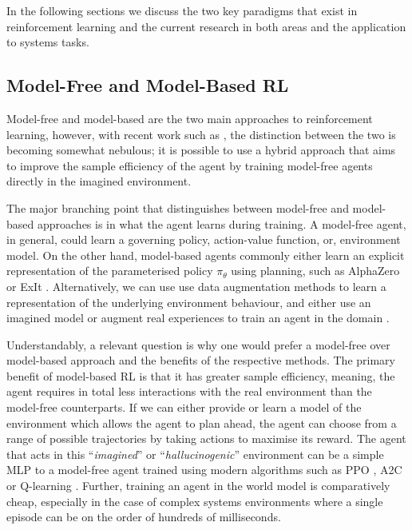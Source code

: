 In the following sections we discuss the two key paradigms that exist in reinforcement learning and the current research in both areas and the application to systems tasks.

\subsection{Model-Free and Model-Based RL}

Model-free and model-based are the two main approaches to reinforcement learning, however, with recent work such as \cite{app10196685, kaiser2020modelbased, robine2021smaller}, the distinction between the two is becoming somewhat nebulous; it is possible to use a hybrid approach that aims to improve the sample efficiency of the agent by training model-free agents directly in the imagined environment.

The major branching point that distinguishes between model-free and model-based approaches is in what the agent learns during training. A model-free agent, in general, could learn a governing policy, action-value function, or, environment model. On the other hand, model-based agents commonly either learn an explicit representation of the parameterised policy $\pi_\theta$ using planning, such as AlphaZero \cite{silver2017mastering} or ExIt \cite{anthony2017thinking}. Alternatively, we can use use data augmentation methods to learn a representation of the underlying environment behaviour, and either use an imagined model or augment real experiences to train an agent in the domain \cite{kaiser2020modelbased, feinberg2018modelbased, freeman2019learning}.

Understandably, a relevant question is why one would prefer a model-free over model-based approach and the benefits of the respective methods. The primary benefit of model-based RL is that it has greater sample efficiency, meaning, the agent requires in total less interactions with the real environment than the model-free counterparts. If we can either provide or learn a model of the environment which allows the agent to plan ahead, the agent can choose from a range of possible trajectories by taking actions to maximise its reward. The agent that acts in this ``\textit{imagined}'' or ``\textit{hallucinogenic}'' environment can be a simple MLP \cite{ha2018worldmodels} to a model-free agent trained using modern algorithms such as PPO \cite{schulman2017proximal}, A2C \cite{mnih2016asynchronous} or Q-learning \cite{watkins1992q, mnih2013playing}. Further, training an agent in the world model is comparatively cheap, especially in the case of complex systems environments where a single episode can be on the order of hundreds of milliseconds.

